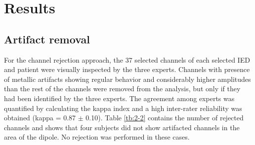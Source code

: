\section{Results}

\subsection{Artifact removal}

For the channel rejection approach, the 37 selected channels of each selected IED and patient were visually inspected by the three experts. Channels with presence of metallic artifacts showing regular behavior and considerably higher amplitudes than the rest of the channels were removed from the analysis, but only if they had been identified by the three experts. The agreement among experts was quantified by calculating the kappa index \citep{Viera2005} and a high inter-rater reliability was obtained (kappa = 0.87 $\pm$ 0.10). Table \ref{tb:2-2} contains the number of rejected channels and shows that four subjects did  not show artifacted channels in the area of the dipole. No rejection was performed in these cases.

